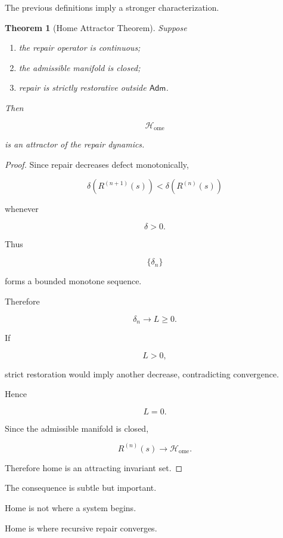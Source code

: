 \documentclass[11pt,oneside]{book}
\numberwithin{equation}{chapter}
\theoremstyle{definition}
\theoremstyle{plain}
\newtheorem{theorem}[definition]{Theorem}
\begin{document}
The previous definitions imply a stronger characterization.

\begin{theorem}[Home Attractor Theorem]

Suppose

\begin{enumerate}
\item the repair operator is continuous;
\item the admissible manifold is closed;
\item repair is strictly restorative outside
$\mathsf{Adm}$.
\end{enumerate}

Then

\[
\mathcal{H}_{\mathrm{ome}}
\]

is an attractor of the repair dynamics.

\end{theorem}

\begin{proof}

Since repair decreases defect monotonically,

\[
\delta
\left(
R^{(n+1)}(s)
\right)
<
\delta
\left(
R^{(n)}(s)
\right)
\]

whenever

\[
\delta>0.
\]

Thus

\[
\{
\delta_n
\}
\]

forms a bounded monotone sequence.

Therefore

\[
\delta_n
\rightarrow
L
\ge0.
\]

If

\[
L>0,
\]

strict restoration would imply another decrease, contradicting convergence.

Hence

\[
L=0.
\]

Since the admissible manifold is closed,

\[
R^{(n)}(s)
\rightarrow
\mathcal{H}_{\mathrm{ome}}.
\]

Therefore home is an attracting invariant set.

\end{proof}

The consequence is subtle but important.

Home is not where a system begins.

Home is where recursive repair converges.
\end{document}
